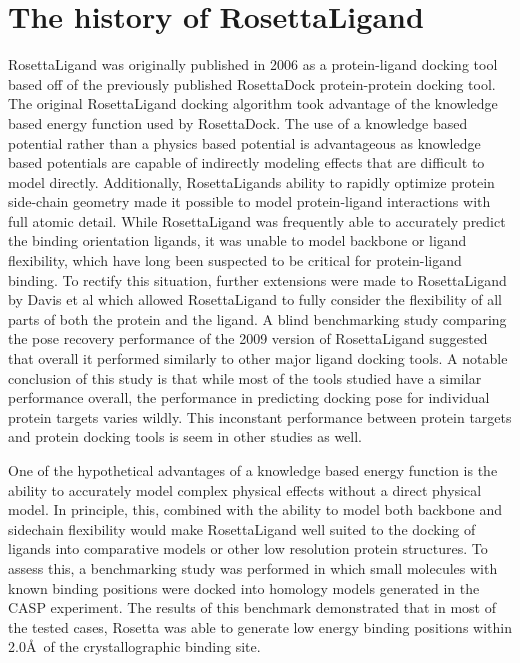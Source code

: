 \section{The history of RosettaLigand}
RosettaLigand was originally published in 2006\citep{Meiler:2006vj} as a protein-ligand docking tool based off of the previously published RosettaDock\citep{Gray:2003uk} protein-protein docking tool.
The original RosettaLigand docking algorithm took advantage of the knowledge based energy function used by RosettaDock.
The use of a knowledge based potential rather than a physics based potential is advantageous as knowledge based potentials are capable of indirectly modeling effects that are difficult to model directly. %
Additionally, RosettaLigands ability to rapidly optimize protein side-chain geometry\citep{Barth:2007cw} made it possible to model protein-ligand interactions with full atomic detail.
While RosettaLigand was frequently able to accurately predict the binding orientation ligands\citep{Meiler:2006vj}, it was unable to model backbone or ligand flexibility, which have long been suspected to be critical for protein-ligand binding\citep{Yang:2014dm,KOSHLAND:1958wa}.
To rectify this situation, further extensions were made to RosettaLigand by Davis et al\citep{Davis:2009bf} which allowed RosettaLigand to fully consider the flexibility of all parts of both the protein and the ligand.
A blind benchmarking study comparing the pose recovery performance of the 2009 version of RosettaLigand suggested that overall it performed similarly to other major ligand docking tools\citep{Davis:2009fx}.
A notable conclusion of this study is that while most of the tools studied have a similar performance overall, the performance in predicting docking pose for individual protein targets varies wildly.
This inconstant performance between protein targets and protein docking tools is seem in other studies as well. 

One of the hypothetical advantages of a knowledge based energy function is the ability to accurately model complex physical effects without a direct physical model.
In principle, this, combined with the ability to model both backbone and sidechain flexibility would make RosettaLigand well suited to the docking of ligands into comparative models or other low resolution protein structures. 
To assess this, a benchmarking study was performed in which small molecules with known binding positions were docked into homology models generated in the CASP experiment\citep{Kaufmann:2012ck}.
The results of this benchmark demonstrated that in most of the tested cases, Rosetta was able to generate low energy binding positions within 2.0\AA\ of the crystallographic binding site.

